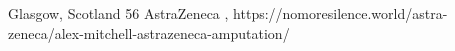           {Glasgow, Scotland}
          {56}
          {AstraZeneca}
          {}
          {,
          }
          {https://nomoresilence.world/astra-zeneca/alex-mitchell-astrazeneca-amputation/}
